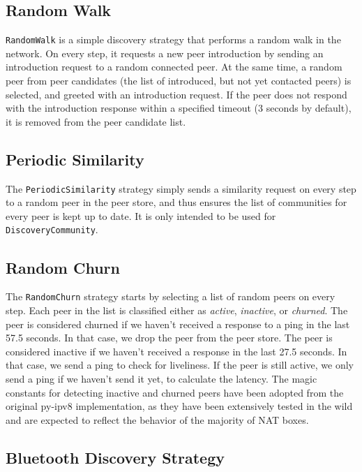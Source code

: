 \subsection{Random Walk}

\texttt{RandomWalk} is a simple discovery strategy that performs a random walk in the network. On every step, it requests a new peer introduction by sending an introduction request to a random connected peer. At the same time, a random peer from peer candidates (the list of introduced, but not yet contacted peers) is selected, and greeted with an introduction request. If the peer does not respond with the introduction response within a specified timeout (3 seconds by default), it is removed from the peer candidate list.

\subsection{Periodic Similarity}

The \texttt{PeriodicSimilarity} strategy simply sends a similarity request on every step to a random peer in the peer store, and thus ensures the list of communities for every peer is kept up to date. It is only intended to be used for \texttt{DiscoveryCommunity}.

\subsection{Random Churn}

The \texttt{RandomChurn} strategy starts by selecting a list of random peers on every step. Each peer in the list is classified either as \textit{active}, \textit{inactive}, or \textit{churned}. The peer is considered churned if we haven't received a response to a ping in the last 57.5 seconds. In that case, we drop the peer from the peer store. The peer is considered inactive if we haven't received a response in the last 27.5 seconds. In that case, we send a ping to check for liveliness. If the peer is still active, we only send a ping if we haven't send it yet, to calculate the latency. The magic constants for detecting inactive and churned peers have been adopted from the original py-ipv8 implementation, as they have been extensively tested in the wild and are expected to reflect the behavior of the majority of NAT boxes. \cite{nat_wild}

\subsection{Bluetooth Discovery Strategy}

